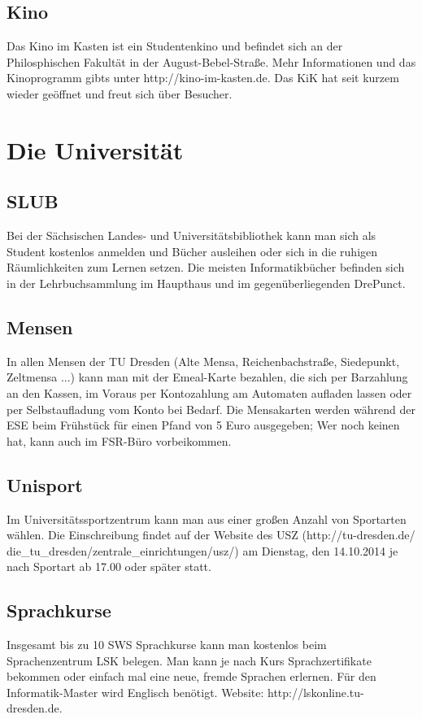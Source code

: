 \documentclass[a4paper,12pt]{report}
\begin{document}
\subsection{Kino}
Das Kino im Kasten ist ein Studentenkino und befindet sich an der Philosphischen Fakultät in der August-Bebel-Straße.
Mehr Informationen und das Kinoprogramm gibts unter http://kino-im-kasten.de.
Das KiK hat seit kurzem wieder geöffnet und freut sich über Besucher.

\section{Die Universität}
\subsection{SLUB}
Bei der Sächsischen Landes- und Universitätsbibliothek kann man sich als Student kostenlos anmelden und Bücher ausleihen oder sich in die ruhigen Räumlichkeiten zum Lernen setzen.
Die meisten Informatikbücher befinden sich in der Lehrbuchsammlung im Haupthaus und im gegenüberliegenden \glqq DrePunct\grqq.
\subsection{Mensen}
In allen Mensen der TU Dresden (Alte Mensa, Reichenbachstraße, Siedepunkt, Zeltmensa ...) kann man mit der \glqq Emeal\grqq-Karte bezahlen, die sich per Barzahlung an den Kassen, im Voraus per Kontozahlung am Automaten aufladen lassen oder per Selbstaufladung vom Konto bei Bedarf.
Die Mensakarten werden während der ESE beim Frühstück für einen Pfand von 5 Euro ausgegeben;
Wer noch keinen hat, kann auch im FSR-Büro vorbeikommen.

\subsection{Unisport}
Im Universitätssportzentrum kann man aus einer großen Anzahl von Sportarten wählen.
Die Einschreibung findet auf der Website des USZ (http://tu-dresden.de/ die\_tu\_dresden/zentrale\_einrichtungen/usz/) am Dienstag, den 14.10.2014 je nach Sportart ab 17.00 oder später statt.

\subsection{Sprachkurse}
Insgesamt bis zu 10 SWS Sprachkurse kann man kostenlos beim Sprachenzentrum LSK belegen.
Man kann je nach Kurs Sprachzertifikate bekommen oder einfach mal eine neue, fremde Sprachen erlernen.
Für den Informatik-Master wird Englisch benötigt.
Website: http://lskonline.tu-dresden.de.
\end{document}
